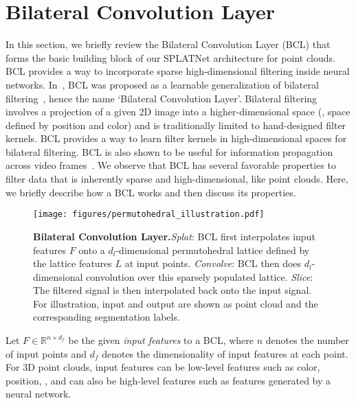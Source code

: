 \documentclass[10pt,twocolumn,letterpaper]{article}
\newcommand{\mycaption}[2]{\caption{\textbf{#1.}\xspace#2}}
\newcommand{\camreadycomment}[1]{{\textcolor{red}{#1}}}
\begin{document}
\section{Bilateral Convolution Layer}\label{sec:review_bcl}

In this section, we briefly review the Bilateral Convolution Layer (BCL) 
that forms the basic building block of our SPLATNet architecture for point clouds.
BCL provides a way to incorporate sparse high-dimensional
filtering inside neural networks. In~\cite{jampani2016learning,kiefel:iclr:2015}, BCL was proposed as a learnable generalization
of bilateral filtering~\cite{tomasi1998bilateral,aurich1995non}, 
hence the name `Bilateral Convolution Layer'.
Bilateral filtering involves a projection of a given 2D image into
a higher-dimensional space (\eg, space defined by position and color) and
is traditionally limited to hand-designed filter kernels. BCL provides a way to learn filter
kernels in high-dimensional spaces for bilateral filtering.
BCL is also shown to be useful for information propagation across video 
frames~\cite{jampani2017video}.
We observe that BCL has several favorable properties to
filter data that is inherently sparse and high-dimensional, like point clouds.
Here, we briefly describe how a BCL works and then discuss its properties.

\begin{figure}
\vspace{-0.2cm}
\begin{center}
\centerline{\texttt{[image: figures/permutohedral\_illustration.pdf]}}
  \vspace{-0.2cm}
  \mycaption{Bilateral Convolution Layer}{\emph{Splat}: BCL first interpolates input features $F$ onto a $d_l$-dimensional permutohedral lattice defined by the lattice features $L$ at input points. \emph{Convolve}: BCL then does $d_l$-dimensional convolution over this sparsely populated lattice. \emph{Slice}: The filtered signal is then interpolated back onto the input signal. For illustration, input and output are shown as point cloud and the corresponding segmentation labels.}
  \label{fig:bcl}
\end{center}
\vspace{-.8cm}
\end{figure}%
Let $F \in \mathbb{R}^{n \times d_f}$ be the given \emph{input features} to a BCL, where $n$ denotes
the number of input points and $d_f$ denotes the dimensionality of input features at each point.
For 3D point clouds, input features can be low-level features such as color, position, \etc, and can also
be high-level features such as features generated by a neural network.
\end{document}

